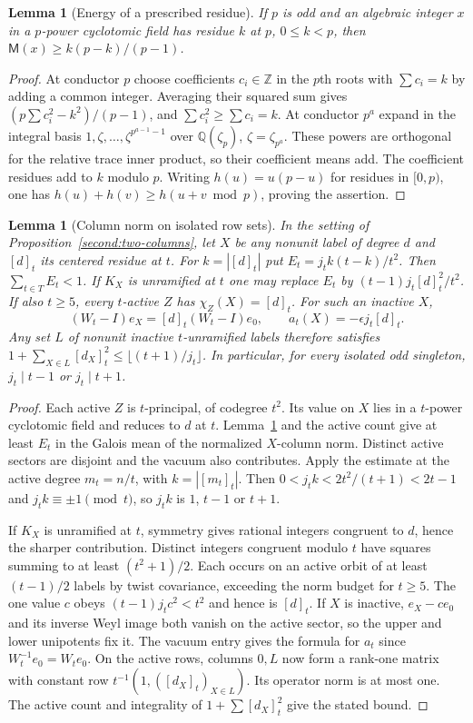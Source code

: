 \documentclass[11pt,a4paper]{article}
\numberwithin{equation}{section}
\newtheorem{lemma}[theorem]{Lemma}
\theoremstyle{remark}
\newcommand{\ZZ}{\mathbb Z}
\newcommand{\QQ}{\mathbb Q}
\begin{document}
\begin{lemma}[Energy of a prescribed residue]\label{lem:singleton-residue-energy}
If $p$ is odd and an algebraic integer $x$ in a $p$-power cyclotomic field has residue $k$ at $p$, $0\le k<p$, then
$\mathsf M(x)\ge k(p-k)/(p-1)$.
\end{lemma}
\begin{proof}
At conductor $p$ choose coefficients $c_i\in\ZZ$ in the $p$th roots with $\sum c_i=k$
by adding a common integer. Averaging their squared sum gives
$(p\sum c_i^2-k^2)/(p-1)$, and $\sum c_i^2\ge\sum c_i=k$.
At conductor $p^a$ expand in the integral basis
$1,\zeta,\ldots,\zeta^{p^{a-1}-1}$ over $\QQ(\zeta_p)$, $\zeta=\zeta_{p^a}$.
These powers are orthogonal for the relative trace inner product, so their coefficient means add.
The coefficient residues add to $k$ modulo $p$.
Writing $h(u)=u(p-u)$ for residues in $[0,p)$, one has $h(u)+h(v)\ge h(u+v\bmod p)$, proving the assertion.
\end{proof}

\begin{lemma}[Column norm on isolated row sets]\label{lem:singleton-energy}
In the setting of Proposition~\ref{second:two-columns}, let
$X$ be any nonunit label of degree $d$ and $[d]_t$ its centered
residue at $t$. For $k=|[d]_t|$ put $E_t=j_tk(t-k)/t^2$.
Then $\sum_{t\in T}E_t<1$. If $K_X$ is unramified at $t$ one may replace
$E_t$ by $(t-1)j_t[d]_t^2/t^2$. If also $t\ge5$, every $t$-active
$Z$ has $\chi_Z(X)=[d]_t$. For such an inactive $X$,
\[
   (W_t-I)e_X=[d]_t(W_t-I)e_0,\qquad a_t(X)=-\epsilon j_t[d]_t .
\]
Any set $L$ of nonunit inactive $t$-unramified labels therefore satisfies
$1+\sum_{X\in L}[d_X]_t^2\le\lfloor(t+1)/j_t\rfloor$.
In particular, for every isolated odd singleton, $j_t\mid t-1$ or
$j_t\mid t+1$.
\end{lemma}
\begin{proof}
Each active $Z$ is $t$-principal, of codegree $t^2$. Its value on
$X$ lies in a $t$-power cyclotomic field and reduces to $d$ at $t$.
Lemma~\ref{lem:singleton-residue-energy} and the active count give
at least $E_t$ in the Galois mean of the normalized $X$-column norm.
Distinct active sectors are disjoint and the vacuum also contributes.
Apply the estimate at the active degree $m_t=n/t$, with
$k=|[m_t]_t|$. Then $0<j_tk<2t^2/(t+1)<2t-1$ and
$j_tk\equiv\pm1\pmod t$, so $j_tk$ is $1$, $t-1$ or $t+1$.

If $K_X$ is unramified at $t$, symmetry gives rational integers
congruent to $d$, hence the sharper contribution. Distinct integers congruent modulo $t$ have squares summing
to at least $(t^2+1)/2$. Each occurs on an active orbit of at least
$(t-1)/2$ labels by twist covariance, exceeding the norm budget for
$t\ge5$. The one value $c$ obeys $(t-1)j_tc^2<t^2$ and hence is
$[d]_t$. If $X$ is inactive, $e_X-ce_0$ and its inverse Weyl image
both vanish on the active sector, so the upper and lower unipotents
fix it. The vacuum entry gives the formula for $a_t$ since
$W_t^{-1}e_0=W_te_0$. On the active rows, columns $0,L$ now form
a rank-one matrix with constant row $t^{-1}(1,([d_X]_t)_{X\in L})$.
Its operator norm is at most one. The active count and integrality
of $1+\sum[d_X]_t^2$ give the stated bound.
\end{proof}
\end{document}
